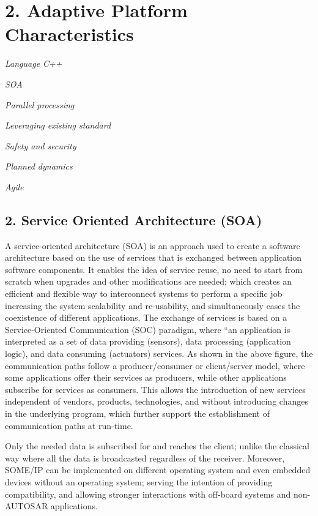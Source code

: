 \section*{2. Adaptive Platform Characteristics}


\begin{DoxyItemize}
\item {\itshape Language C++}
\item {\itshape S\+OA}
\item {\itshape Parallel processing}
\item {\itshape Leveraging existing standard}
\item {\itshape Safety and security}
\item {\itshape Planned dynamics}
\item {\itshape Agile}
\end{DoxyItemize}

\subsection*{2. Service Oriented Architecture (S\+OA)}

A service-\/oriented architecture (S\+OA) is an approach used to create a software architecture based on the use of services that is exchanged between application software components. It enables the idea of service reuse, no need to start from scratch when upgrades and other modifications are needed; which creates an efficient and flexible way to interconnect systems to perform a specific job increasing the system scalability and re-\/usability, and simultaneously eases the coexistence of different applications.  The exchange of services is based on a Service-\/\+Oriented Communication (S\+OC) paradigm, where “an application is interpreted as a set of data providing (sensors), data processing (application logic), and data consuming (actuators) services. As shown in the above figure, the communication paths follow a producer/consumer or client/server model, where some applications offer their services as producers, while other applications subscribe for services as consumers. This allows the introduction of new services independent of vendors, products, technologies, and without introducing changes in the underlying program, which further support the establishment of communication paths at run-\/time.

Only the needed data is subscribed for and reaches the client; unlike the classical way where all the data is broadcasted regardless of the receiver. Moreover, S\+O\+M\+E/\+IP can be implemented on different operating system and even embedded devices without an operating system; serving the intention of providing compatibility, and allowing stronger interactions with off-\/board systems and non-\/\+A\+U\+T\+O\+S\+AR applications.

